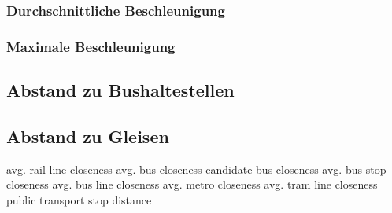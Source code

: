 \subsubsection{Durchschnittliche Beschleunigung}
\subsubsection{Maximale Beschleunigung}
\subsection{Abstand zu Bushaltestellen}
\subsection{Abstand zu Gleisen}
avg. rail line closeness
avg. bus closeness
candidate bus closeness
avg. bus stop closeness
avg. bus line closeness
avg. metro closeness
avg. tram line closeness
public transport stop distance


\clearpage

